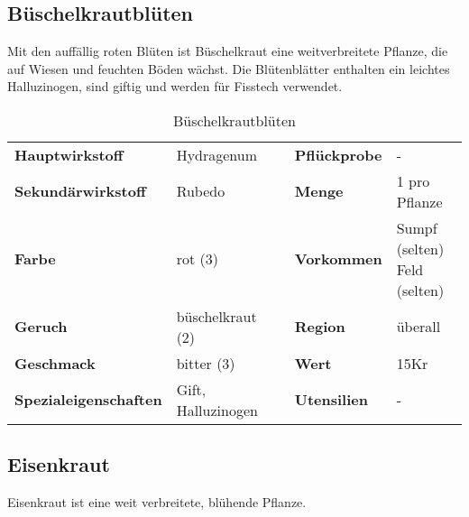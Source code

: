 \subsection{Büschelkrautblüten}
Mit den auffällig roten Blüten ist Büschelkraut eine weitverbreitete Pflanze, die auf Wiesen und feuchten Böden wächst. Die Blütenblätter enthalten ein leichtes Halluzinogen, sind giftig und werden für Fisstech verwendet. 
\newpage
\begin{table}[h] 
\begin{center} 
\begin{tabular}{|l|l|p{1cm}|l|l|} 
  	\cline{1-2} \cline{4-5} 
  	\textbf{Hauptwirkstoff} & Hydragenum && \textbf{Pflückprobe} & - \\ \cline{1-2} \cline{4-5} 
  	\textbf{Sekundärwirkstoff} & Rubedo && \textbf{Menge} & 1 pro Pflanze \\ \cline{1-2} \cline{4-5} 
  	\textbf{Farbe} & rot (3) && \textbf{Vorkommen} & \brcell{Sumpf (selten)\\Feld (selten)} \\ \cline{1-2} \cline{4-5} 
  	\textbf{Geruch} & büschelkraut (2) && \textbf{Region} & überall \\ \cline{1-2} \cline{4-5} 
  	\textbf{Geschmack} & bitter (3) && \textbf{Wert} & 15Kr \\ \cline{1-2} \cline{4-5} 
  	\textbf{Spezialeigenschaften} & Gift, Halluzinogen && \textbf{Utensilien} & - \\ \cline{1-2} \cline{4-5} 
\end{tabular} 
\end{center} 
\caption{Büschelkrautblüten} 
\label{tab:bueschelkrautblueten} 
\end{table}




\subsection{Eisenkraut}
Eisenkraut ist eine weit verbreitete, blühende Pflanze. 


